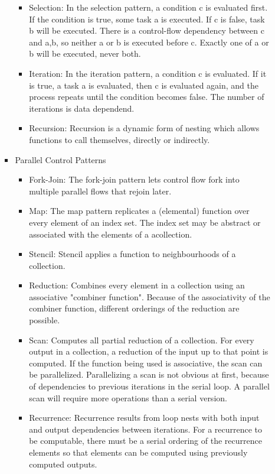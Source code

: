 \documentclass[paper=a4, fontsize=11pt]{scrartcl} %
\numberwithin{equation}{section} %
\numberwithin{figure}{section} %
\numberwithin{table}{section} %
\begin{document}
\begin{itemize}
\begin{itemize}
\begin{itemize}
\begin{itemize}
        \item Selection: In the selection pattern, a condition c is evaluated first. If the condition is true, some task a is executed. If c is false, task b will be executed. There is a control-flow dependency between c and a,b, so neither a or b is executed before c. Exactly one of a or b will be executed, never both.
        \item Iteration: In the iteration pattern, a condition c is evaluated. If it is true, a task a is evaluated, then c is evaluated again, and the process repeats until the condition becomes false. The number of iterations is data dependend.
        \item Recursion: Recursion is a dynamic form of nesting which allows functions to call themselves, directly or indirectly.
      \end{itemize}
      \item Parallel Control Patterns
      \begin{itemize}
        \item Fork-Join: The fork-join pattern lets control flow fork into multiple parallel flows that rejoin later.
        \item Map: The map pattern replicates a (elemental) function over every element of an index set. The index set may be abstract or associated with the elements of a acollection.
        \item Stencil: Stencil applies a function to neighbourhoods of a collection.
        \item Reduction: Combines every element in a collection using an associative "combiner function". Because of the associativity of the combiner function, different orderings of the reduction are possible.
        \item Scan: Computes all partial reduction of a collection. For every output in a collection, a reduction of the input up to that point is computed. If the function being used is associative, the scan can be parallelized. Parallelizing a scan is not obvious at first, because of dependencies to previous iterations in the serial loop. A parallel scan will require more operations than a serial version.
        \item Recurrence: Recurrence results from loop nests with both input and output dependencies between iterations. For a recurrence to be computable, there must be a serial ordering of the recurrence elements so that elements can be computed using previously computed outputs.
      \end{itemize}

\end{itemize}
\end{itemize}
\end{itemize}
\end{document}
